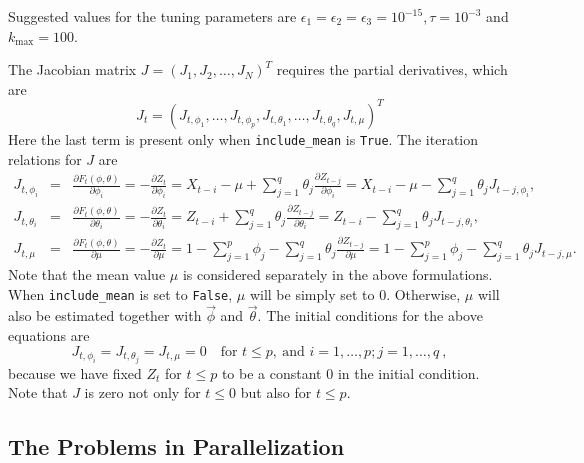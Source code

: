 \documentclass[english,10pt]{llncs}
\begin{document}
\begin{algorithm}[ht]
\label{alg:LM}
\end{algorithm}

Suggested values for the tuning parameters are $\epsilon_1 = \epsilon_2 =
\epsilon_3 = 10^{-15}, \tau = 10^{-3}$ and $k_{\max} = 100$.

The Jacobian matrix $J = {(J_{1}, J_{2}, \ldots, J_N)}^T$ requires the partial derivatives, which are
\begin{equation}
J_t = {(J_{t, \phi_1}, \ldots, J_{t,\phi_p}, J_{t,\theta_1}, \ldots,
  J_{t,\theta_q}, J_{t,\mu})}^T
\end{equation}
Here the last term is present only when \texttt{include\_mean} is
\texttt{True}.
The iteration relations for $J$ are
\begin{eqnarray}
J_{t, \phi_i} &=& \frac{\partial F_t(\phi,\theta)}{\partial \phi_i} =
-\frac{\partial Z_t}{\partial \phi_i} = X_{t-i}-\mu + \sum_{j=1}^q
\theta_j \frac{\partial Z_{t - j}}{\partial \phi_i} = X_{t-i}-\mu - \sum_{j=1}^q
\theta_j J_{t-j,\phi_i}, \label{eq:J1}\\
J_{t, \theta_i}&=&\frac{\partial F_t(\phi,\theta)}{\partial \theta_i} =
-\frac{\partial Z_t}{\partial \theta_i} = Z_{t-i} + \sum_{j =1}^q
\theta_j \frac{\partial Z_{t - j}}{\partial \theta_i} = Z_{t-i} -
\sum_{j=1}^q \theta_j J_{t-j,\theta_i}, \label{eq:J2}\\
J_{t, \mu} &=&\frac{\partial F_t(\phi,\theta)}{\partial \mu} =
-\frac{\partial Z_t}{\partial \mu} = 1 -
\sum_{j=1}^p \phi_j - \sum_{j=1}^q \theta_j \frac{\partial
  Z_{t-j}}{\partial \mu} = 1 - \sum_{j=1}^p \phi_j - \sum_{j=1}^q
\theta_j J_{t-j,\mu}. \label{eq:J3}
\end{eqnarray}
Note that the mean value $\mu$ is considered separately in the above
formulations. When \texttt{include\_mean} is set to \texttt{False}, $\mu$ will be simply
set to 0. Otherwise, $\mu$ will also be estimated together with
$\vec{\phi}$ and $\vec{\theta}$. The initial conditions for the above
equations are
\begin{equation}
J_{t,\phi_i} = J_{t,\theta_j} = J_{t,\mu} = 0 \quad \mbox{for }
t \leq p,\ \mbox{and }i=1,\dots,p; j = 1, \dots, q\ ,
\end{equation}
because we have fixed $Z_t$ for $t\leq p$ to be a constant $0$ in the initial
condition. Note that $J$ is zero not only for $t\leq
0$ but also for $t\leq p$.

\subsection{The Problems in Parallelization}
\end{document}
